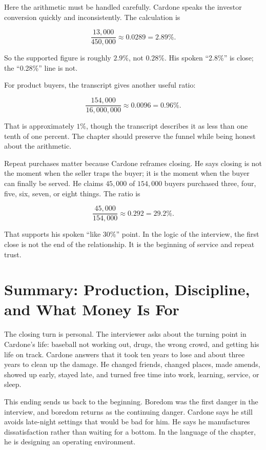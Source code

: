 Here the arithmetic must be handled carefully. Cardone speaks the investor conversion quickly and inconsistently. The calculation is

\begin{equation}
\frac{13{,}000}{450{,}000}
\approx 0.0289
=2.89\%.
\end{equation}

So the supported figure is roughly \(2.9\%\), not \(0.28\%\). His spoken ``2.8\%'' is close; the ``0.28\%'' line is not.

For product buyers, the transcript gives another useful ratio:

\begin{equation}
\frac{154{,}000}{16{,}000{,}000}
\approx 0.0096
=0.96\%.
\end{equation}

That is approximately \(1\%\), though the transcript describes it as less than one tenth of one percent. The chapter should preserve the funnel while being honest about the arithmetic.

Repeat purchases matter because Cardone reframes closing. He says closing is not the moment when the seller traps the buyer; it is the moment when the buyer can finally be served. He claims \(45{,}000\) of \(154{,}000\) buyers purchased three, four, five, six, seven, or eight things. The ratio is

\begin{equation}
\frac{45{,}000}{154{,}000}
\approx 0.292
=29.2\%.
\end{equation}

That supports his spoken ``like \(30\%\)'' point. In the logic of the interview, the first close is not the end of the relationship. It is the beginning of service and repeat trust.

\section{Summary: Production, Discipline, and What Money Is For}

The closing turn is personal. The interviewer asks about the turning point in Cardone's life: baseball not working out, drugs, the wrong crowd, and getting his life on track. Cardone answers that it took ten years to lose and about three years to clean up the damage. He changed friends, changed places, made amends, showed up early, stayed late, and turned free time into work, learning, service, or sleep.

This ending sends us back to the beginning. Boredom was the first danger in the interview, and boredom returns as the continuing danger. Cardone says he still avoids late-night settings that would be bad for him. He says he manufactures dissatisfaction rather than waiting for a bottom. In the language of the chapter, he is designing an operating environment.

